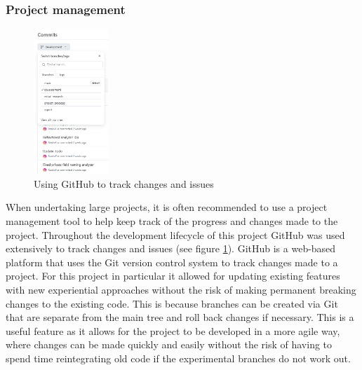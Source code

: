 \subsubsection{Project management}

\begin{figure}
    \vspace{-35px}
    \centering
    \caption{Using GitHub to track changes and issues}
    \label{fig:GitCommitHistory}
    \includegraphics[width=0.25\textwidth]{Figures/GitHubCommitHistoryCropped.png}
\end{figure}

When undertaking large projects, it is often recommended to use a project management tool to help keep track of the progress and changes made to the project. Throughout the development lifecycle of this project GitHub was used extensively to track changes and issues (see figure \ref{fig:GitCommitHistory}). GitHub is a web-based platform that uses the Git version control system to track changes made to a project. For this project in particular it allowed for updating existing features with new experiential approaches without the risk of making permanent breaking changes to the existing code. This is because branches can be created via Git that are separate from the main tree and roll back changes if necessary. This is a useful feature as it allows for the project to be developed in a more agile way, where changes can be made quickly and easily without the risk of having to spend time reintegrating old code if the experimental branches do not work out.
